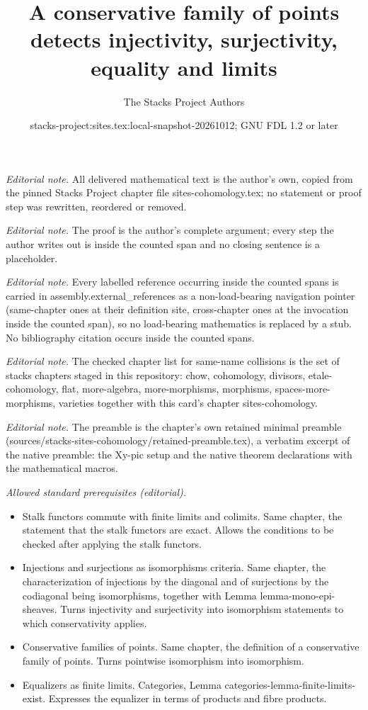 \documentclass[10pt,a4paper]{amsart}
\title{A conservative family of points detects injectivity, surjectivity, equality and limits}
\author{The Stacks Project Authors}
\date{stacks-project:sites.tex:local-snapshot-20261012; GNU FDL 1.2 or later}
\theoremstyle{plain}
\theoremstyle{definition}
\theoremstyle{remark}
\numberwithin{equation}{subsection}
\begin{document}
\maketitle
\noindent\textit{Editorial note.} All delivered mathematical text is the author's own, copied from the pinned Stacks Project chapter file sites-cohomology.tex; no statement or proof step was rewritten, reordered or removed.\par\medskip
\noindent\textit{Editorial note.} The proof is the author's complete argument; every step the author writes out is inside the counted span and no closing sentence is a placeholder.\par\medskip
\noindent\textit{Editorial note.} Every labelled reference occurring inside the counted spans is carried in assembly.external\_references as a non-load-bearing navigation pointer (same-chapter ones at their definition site, cross-chapter ones at the invocation inside the counted span), so no load-bearing mathematics is replaced by a stub. No bibliography citation occurs inside the counted spans.\par\medskip
\noindent\textit{Editorial note.} The checked chapter list for same-name collisions is the set of stacks chapters staged in this repository: chow, cohomology, divisors, etale-cohomology, flat, more-algebra, more-morphisms, morphisms, spaces-more-morphisms, varieties together with this card's chapter sites-cohomology.\par\medskip
\noindent\textit{Editorial note.} The preamble is the chapter's own retained minimal preamble (sources/stacks-sites-cohomology/retained-preamble.tex), a verbatim excerpt of the native preamble: the Xy-pic setup and the native theorem declarations with the mathematical macros.\par\medskip
\noindent\textit{Allowed standard prerequisites (editorial).}\begin{itemize}
\item Stalk functors commute with finite limits and colimits. Same chapter, the statement that the stalk functors are exact. Allows the conditions to be checked after applying the stalk functors.
\item Injections and surjections as isomorphisms criteria. Same chapter, the characterization of injections by the diagonal and of surjections by the codiagonal being isomorphisms, together with Lemma lemma-mono-epi-sheaves. Turns injectivity and surjectivity into isomorphism statements to which conservativity applies.
\item Conservative families of points. Same chapter, the definition of a conservative family of points. Turns pointwise isomorphism into isomorphism.
\item Equalizers as finite limits. Categories, Lemma categories-lemma-finite-limits-exist. Expresses the equalizer in terms of products and fibre products.
\end{itemize}\medskip
\end{document}
